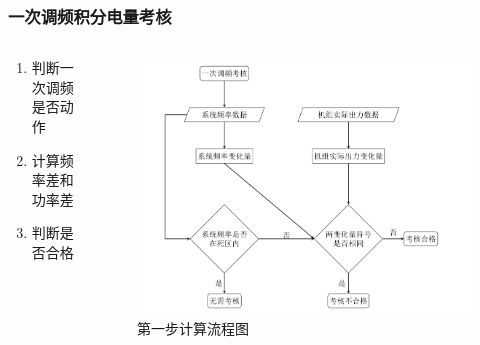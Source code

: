 \documentclass[aspectratio=43, 10pt, utf8, mathserif]{beamer}
\begin{document}
	\begin{frame}
	\frametitle{一次调频积分电量考核}
	
	\begin{columns}
		\begin{column}{.4\linewidth}
			\begin{enumerate}
				\item 判断一次调频是否动作
				\item 计算频率差和功率差
				\item 判断是否合格
			\end{enumerate}
		\end{column}
		
		\begin{column}{.6\linewidth}
		\begin{figure}[H]
			\centering
			\includegraphics[width=1.05\linewidth]{pic/screenshot030}
			\caption{第一步计算流程图}
			\label{fig:screenshot030}
		\end{figure}
			
		\end{column}
	\end{columns}
\end{frame}
\end{document}
